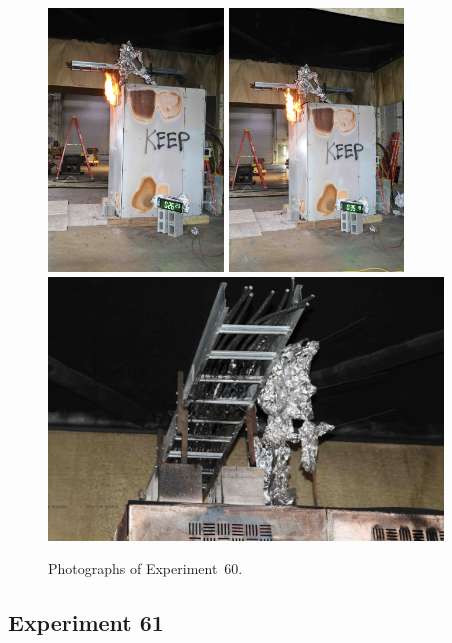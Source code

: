 \documentclass[12pt]{article}
\begin{document}
\begin{figure}[p]
\centering
\includegraphics[height=2.75in,angle=-90]{../FIGURES/Test_60_26_min_23_s}
\includegraphics[height=2.75in,angle=-90]{../FIGURES/Test_60_35_min_18_s} \\
\includegraphics[height=2.75in]{../FIGURES/Test_60_scar}
\caption[Photographs of Experiment~60]{Photographs of Experiment~60.}
\label{fig:Test_60_photos}
\end{figure}


\clearpage

\subsection{Experiment 61}
\end{document}
